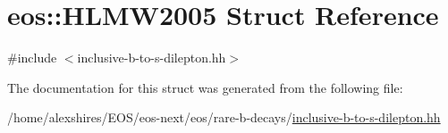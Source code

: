 \hypertarget{structeos_1_1HLMW2005}{
\section{eos::HLMW2005 Struct Reference}
\label{structeos_1_1HLMW2005}
}


{\ttfamily \#include $<$inclusive-\/b-\/to-\/s-\/dilepton.hh$>$}

The documentation for this struct was generated from the following file:\begin{DoxyCompactItemize}
\item 
/home/alexshires/EOS/eos-\/next/eos/rare-\/b-\/decays/\hyperlink{inclusive-b-to-s-dilepton_8hh}{inclusive-\/b-\/to-\/s-\/dilepton.hh}\end{DoxyCompactItemize}
